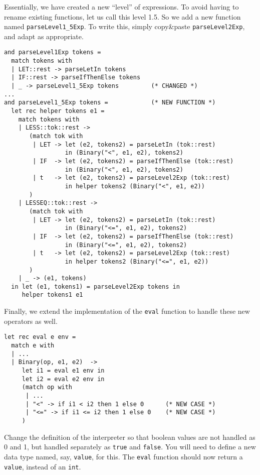 \documentclass[addpoints]{exam}
\begin{document}
\begin{questions}
\begin{solution}
    Essentially, we have created a new ``level'' of expressions.
    To avoid having to rename existing functions, let us call this level 1.5.
    So we add a new function named \texttt{parseLevel1\_5Exp}.
    To write this, simply copy\&paste \texttt{parseLevel2Exp},
    and adapt as appropriate.
    
    {\small
    \begin{verbatim}      
and parseLevel1Exp tokens =
  match tokens with
  | LET::rest -> parseLetIn tokens
  | IF::rest -> parseIfThenElse tokens
  | _ -> parseLevel1_5Exp tokens         (* CHANGED *)
...
and parseLevel1_5Exp tokens =            (* NEW FUNCTION *)
  let rec helper tokens e1 =
    match tokens with
    | LESS::tok::rest ->
       (match tok with
        | LET -> let (e2, tokens2) = parseLetIn (tok::rest)
                 in (Binary("<", e1, e2), tokens2)
        | IF  -> let (e2, tokens2) = parseIfThenElse (tok::rest)
                 in (Binary("<", e1, e2), tokens2)
        | t   -> let (e2, tokens2) = parseLevel2Exp (tok::rest)
                 in helper tokens2 (Binary("<", e1, e2))
       )
    | LESSEQ::tok::rest ->
       (match tok with
        | LET -> let (e2, tokens2) = parseLetIn (tok::rest)
                 in (Binary("<=", e1, e2), tokens2)
        | IF  -> let (e2, tokens2) = parseIfThenElse (tok::rest)
                 in (Binary("<=", e1, e2), tokens2)
        | t   -> let (e2, tokens2) = parseLevel2Exp (tok::rest)
                 in helper tokens2 (Binary("<=", e1, e2))
       )
    | _ -> (e1, tokens)
  in let (e1, tokens1) = parseLevel2Exp tokens in
     helper tokens1 e1
    \end{verbatim}
    }

    Finally, we extend the implementation of the \texttt{eval}
    function to handle these new operators as well.

    {\small
    \begin{verbatim}      
let rec eval e env =
  match e with
  | ...
  | Binary(op, e1, e2)  ->
     let i1 = eval e1 env in
     let i2 = eval e2 env in
     (match op with
      | ...
      | "<" -> if i1 < i2 then 1 else 0      (* NEW CASE *)
      | "<=" -> if i1 <= i2 then 1 else 0    (* NEW CASE *)
     )
    \end{verbatim}
    }
  \end{solution}

  
  \question
  Change the definition of the interpreter so that boolean values are not handled
  as 0 and 1, but handled separately as \texttt{true} and \texttt{false}.
  You will need to define a new data type named, say, \texttt{value}, for this.
  The \texttt{eval} function should now return a \texttt{value},
  instead of an \texttt{int}.


\end{questions}
\end{document}
